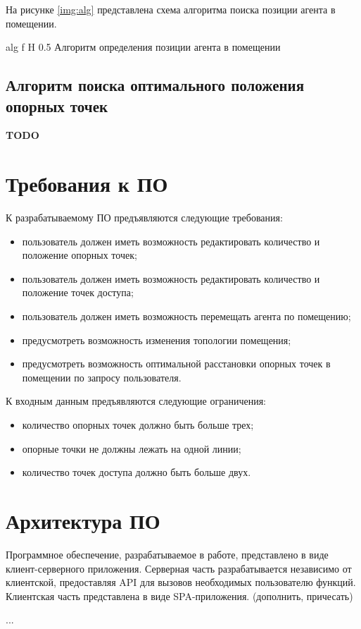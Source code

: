 На рисунке \ref{img:alg} представлена схема алгоритма поиска позиции агента в помещении.

    {alg}
    {f}
    {H}
    {0.5\linewidth}
    {Алгоритм определения позиции агента в помещении}

\subsection{Алгоритм поиска оптимального положения опорных точек}

\textbf{TODO}

\section{Требования к ПО}

К разрабатываемому ПО предъявляются следующие требования:

\begin{itemize}[label=---]
    \item пользователь должен иметь возможность редактировать количество и положение опорных точек;
    \item пользователь должен иметь возможность редактировать количество и положение точек доступа;
    \item пользователь должен иметь возможность перемещать агента по помещению;
    \item предусмотреть возможность изменения топологии помещения;
    \item предусмотреть возможность оптимальной расстановки опорных точек в помещении по запросу пользователя.
\end{itemize}

К входным данным предъявляются следующие ограничения:

\begin{itemize}[label=---]
    \item количество опорных точек должно быть больше трех;
    \item опорные точки не должны лежать на одной линии;
    \item количество точек доступа должно быть больше двух.
\end{itemize}

\section{Архитектура ПО}

Программное обеспечение, разрабатываемое в работе, представлено в виде клиент-серверного приложения. Серверная часть разрабатывается независимо от клиентской, предоставляя API для вызовов необходимых пользователю функций. Клиентская часть представлена в виде SPA-приложения. (дополнить, причесать)

...
